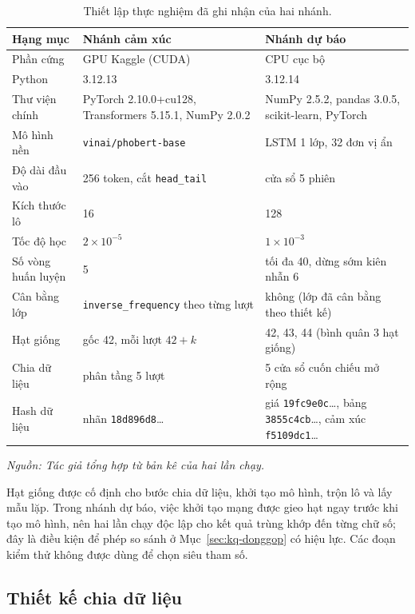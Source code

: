\begin{table}[H]
  \centering
  \caption{Thiết lập thực nghiệm đã ghi nhận của hai nhánh.}
  \label{tab:kq-setup}
  \begin{tabular}{p{3.6cm} p{4.6cm} p{4.6cm}}
    \toprule
    Hạng mục & Nhánh cảm xúc & Nhánh dự báo \\
    \midrule
    Phần cứng & GPU Kaggle (CUDA) & CPU cục bộ \\
    Python & 3.12.13 & 3.12.14 \\
    Thư viện chính & PyTorch 2.10.0+cu128, Transformers 5.15.1, NumPy 2.0.2 & NumPy 2.5.2, pandas 3.0.5, scikit-learn, PyTorch \\
    Mô hình nền & \texttt{vinai/phobert-base} & LSTM 1 lớp, 32 đơn vị ẩn \\
    Độ dài đầu vào & 256 token, cắt \texttt{head\_tail} & cửa sổ 5 phiên \\
    Kích thước lô & 16 & 128 \\
    Tốc độ học & $2\times10^{-5}$ & $1\times10^{-3}$ \\
    Số vòng huấn luyện & 5 & tối đa 40, dừng sớm kiên nhẫn 6 \\
    Cân bằng lớp & \texttt{inverse\_frequency} theo từng lượt & không (lớp đã cân bằng theo thiết kế) \\
    Hạt giống & gốc 42, mỗi lượt $42+k$ & 42, 43, 44 (bình quân 3 hạt giống) \\
    Chia dữ liệu & phân tầng 5 lượt & 5 cửa sổ cuốn chiếu mở rộng \\
    Hash dữ liệu & nhãn \texttt{18d896d8}\ldots & giá \texttt{19fc9e0c}\ldots, bảng \texttt{3855c4cb}\ldots, cảm xúc \texttt{f5109dc1}\ldots \\
    \bottomrule
  \end{tabular}
\noindent\textit{Nguồn: Tác giả tổng hợp từ bản kê của hai lần chạy.}
\end{table}

Hạt giống được cố định cho bước chia dữ liệu, khởi tạo mô hình, trộn lô và lấy mẫu lặp.
Trong nhánh dự báo, việc khởi tạo mạng được gieo hạt ngay trước khi tạo mô hình, nên hai
lần chạy độc lập cho kết quả trùng khớp đến từng chữ số; đây là điều kiện để phép so sánh
ở Mục~\ref{sec:kq-donggop} có hiệu lực. Các đoạn kiểm thử không được dùng để chọn
siêu tham số.

\subsection{Thiết kế chia dữ liệu}

